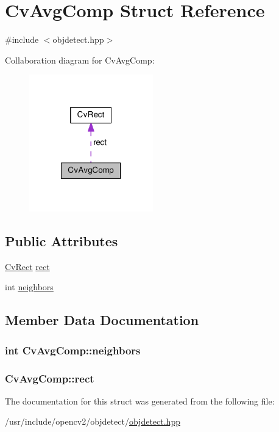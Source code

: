\hypertarget{structCvAvgComp}{\section{Cv\-Avg\-Comp Struct Reference}
\label{structCvAvgComp}
}


{\ttfamily \#include $<$objdetect.\-hpp$>$}



Collaboration diagram for Cv\-Avg\-Comp\-:\nopagebreak
\begin{figure}[H]
\begin{center}
\leavevmode
\includegraphics[width=152pt]{structCvAvgComp__coll__graph}
\end{center}
\end{figure}
\subsection*{Public Attributes}
\begin{DoxyCompactItemize}
\item 
\hyperlink{structCvRect}{Cv\-Rect} \hyperlink{structCvAvgComp_ae2dc3247595d03a8a25e46ae52ef8b84}{rect}
\item 
int \hyperlink{structCvAvgComp_ab4036e356627ac97ef3314354be7e3d0}{neighbors}
\end{DoxyCompactItemize}


\subsection{Member Data Documentation}
\hypertarget{structCvAvgComp_ab4036e356627ac97ef3314354be7e3d0}{
\subsubsection[{neighbors}]{\setlength{\rightskip}{0pt plus 5cm}int Cv\-Avg\-Comp\-::neighbors}}\label{structCvAvgComp_ab4036e356627ac97ef3314354be7e3d0}
\hypertarget{structCvAvgComp_ae2dc3247595d03a8a25e46ae52ef8b84}{
\subsubsection[{rect}]{ Cv\-Avg\-Comp\-::rect}}\label{structCvAvgComp_ae2dc3247595d03a8a25e46ae52ef8b84}


The documentation for this struct was generated from the following file\-:\begin{DoxyCompactItemize}
\item 
/usr/include/opencv2/objdetect/\hyperlink{objdetect_8hpp}{objdetect.\-hpp}\end{DoxyCompactItemize}
